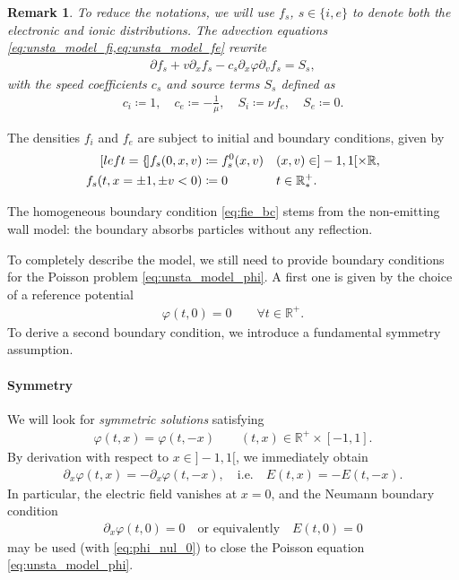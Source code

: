 \documentclass{article}
\newtheorem{remarque}{Remark}[section]
\numberwithin{equation}{section}
\newcommand{\R}{\mathbb{R}}
\newcommand{\mysubeq}[2]{ %
	\begin{subequations}\label{#1}
		\begin{align}[left = {\empheqlbrace}]
			#2
		\end{align}
	\end{subequations}	
}
\begin{document}
\begin{remarque}
	To reduce the notations, we will use $f_s$, $s\in\{i,e\}$ to denote both the electronic and ionic distributions. The advection equations \cref{eq:unsta_model_fi,eq:unsta_model_fe} rewrite 
	\begin{align*}
		\partial f_s + v \partial_x f_s - c_s \partial_x \varphi \partial_v f_s = S_s,
	\end{align*}
	with the speed coefficients $c_s$ and source terms $S_s$ defined as
	\begin{align*}
		c_i \coloneqq 1, \quad c_e \coloneqq -\frac{1}{\mu}, \quad S_i \coloneqq \nu f_e, \quad S_e \coloneqq 0.
	\end{align*}
\end{remarque}

The densities $f_i$ and $f_e$ are subject to initial and boundary conditions, given by
\mysubeq{eq:unsta_model_bc}{
	f_{s}(0,x,v) &\coloneqq f_{s}^0(x,v) && (x,v) \in ]-1,1[ \times \R, \label{eq:init} \\
	f_{s}(t,x=\pm 1,\pm v < 0) &\coloneqq 0  && t \in \R^+_*. \label{eq:fie_bc}
}
The homogeneous boundary condition \cref{eq:fie_bc} stems from the non-emitting wall model: the boundary absorbs particles without any reflection.

To completely describe the model, we still need to provide boundary conditions for the Poisson problem \cref{eq:unsta_model_phi}. A first one is given by the choice of a reference potential
\begin{align}
	\varphi(t,0) = 0 \quad \quad \forall t \in \R^+. \label{eq:phi_nul_0}
\end{align}
To derive a second boundary condition, we introduce a fundamental symmetry assumption.

\paragraph{Symmetry}

We will look for \emph{symmetric solutions} satisfying 
\begin{align}\label{eq:phi_is_pair}
	\varphi(t,x) = \varphi (t,-x) \quad \quad (t,x) \in \R^+ \times [-1,1].
\end{align}
By derivation with respect to $x \in ]-1,1[$, we immediately obtain 
\begin{align*}
	\partial_x \varphi(t,x) = - \partial_x \varphi (t,-x), \quad \text{i.e.} \quad E(t,x) = - E(t,-x).
\end{align*}
In particular, the electric field vanishes at $x=0$, and the Neumann boundary condition
\begin{align}\label{eq:phi_bc_neumann}
	\partial_x \varphi (t,0) = 0 \quad \text{or equivalently} \quad E(t,0) = 0
\end{align}
may be used (with \cref{eq:phi_nul_0}) to close the Poisson equation \cref{eq:unsta_model_phi}.
\end{document}
